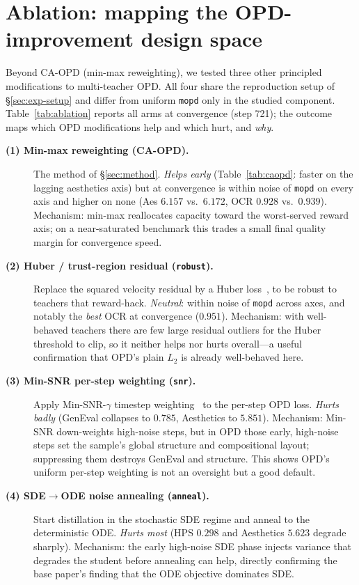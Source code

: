 \section{Ablation: mapping the OPD-improvement design space}
\label{sec:ablation}

Beyond CA-OPD (min-max reweighting), we tested three other principled
modifications to multi-teacher OPD. All four share the reproduction setup of
\S\ref{sec:exp-setup} and differ from uniform \texttt{mopd} only in the studied
component. Table~\ref{tab:ablation} reports all arms at convergence (step 721);
the outcome maps which OPD modifications help and which hurt, and \emph{why}.

\begin{description}
  \item[\textnormal{\textbf{(1) Min-max reweighting (CA-OPD).}}] The method of
  \S\ref{sec:method}. \emph{Helps early} (Table~\ref{tab:caopd}: faster on the
  lagging aesthetics axis) but at convergence is within noise of \texttt{mopd} on
  every axis and higher on none (Aes $6.157$ vs.\ $6.172$, OCR $0.928$ vs.\
  $0.939$). Mechanism: min-max reallocates capacity toward the worst-served reward
  axis; on a near-saturated benchmark this trades a small final quality margin for
  convergence speed.

  \item[\textnormal{\textbf{(2) Huber / trust-region residual (\texttt{robust}).}}]
  Replace the squared velocity residual by a Huber loss~\cite{huber1964robust}, to
  be robust to teachers that reward-hack. \emph{Neutral}: within noise of
  \texttt{mopd} across axes, and notably the \emph{best} OCR at convergence
  ($0.951$). Mechanism: with well-behaved teachers there are few large residual
  outliers for the Huber threshold to clip, so it neither helps nor hurts
  overall---a useful confirmation that OPD's plain $L_2$ is already well-behaved
  here.

  \item[\textnormal{\textbf{(3) Min-SNR per-step weighting (\texttt{snr}).}}]
  Apply Min-SNR-$\gamma$ timestep weighting~\cite{hang2023efficient} to the
  per-step OPD loss. \emph{Hurts badly} (GenEval collapses to $0.785$, Aesthetics
  to $5.851$). Mechanism: Min-SNR down-weights high-noise steps, but in OPD those
  early, high-noise steps set the sample's global structure and compositional
  layout; suppressing them destroys GenEval and structure. This shows OPD's
  uniform per-step weighting is not an oversight but a good default.

  \item[\textnormal{\textbf{(4) SDE$\to$ODE noise annealing (\texttt{anneal}).}}]
  Start distillation in the stochastic SDE regime and anneal to the deterministic
  ODE. \emph{Hurts most} (HPS $0.298$ and Aesthetics $5.623$ degrade sharply).
  Mechanism: the early high-noise SDE phase injects variance that degrades the
  student before annealing can help, directly confirming the base paper's finding
  that the ODE objective dominates SDE.
\end{description}

